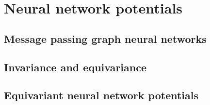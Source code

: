 \section{Neural network potentials}

\subsection{Message passing graph neural networks}

\subsection{Invariance and equivariance}

\subsection{Equivariant neural network potentials}